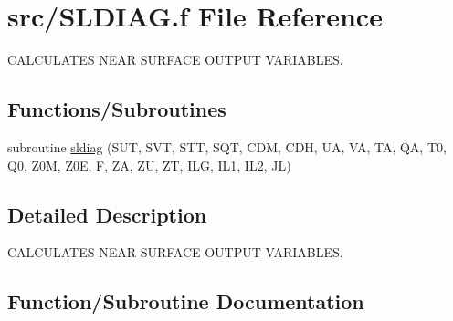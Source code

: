 \hypertarget{SLDIAG_8f}{}\section{src/\+S\+L\+D\+I\+A\+G.f File Reference}
\label{SLDIAG_8f}


C\+A\+L\+C\+U\+L\+A\+T\+E\+S N\+E\+A\+R S\+U\+R\+F\+A\+C\+E O\+U\+T\+P\+U\+T V\+A\+R\+I\+A\+B\+L\+E\+S.  


\subsection*{Functions/\+Subroutines}
\begin{DoxyCompactItemize}
\item 
subroutine \hyperlink{SLDIAG_8f_ad70c758db99cc5fdf4cabbcd33447dd2}{sldiag} (S\+U\+T, S\+V\+T, S\+T\+T, S\+Q\+T, C\+D\+M, C\+D\+H, U\+A, V\+A, T\+A, Q\+A, T0, Q0, Z0\+M, Z0\+E, F, Z\+A, Z\+U, Z\+T, I\+L\+G, I\+L1, I\+L2, J\+L)
\end{DoxyCompactItemize}


\subsection{Detailed Description}
C\+A\+L\+C\+U\+L\+A\+T\+E\+S N\+E\+A\+R S\+U\+R\+F\+A\+C\+E O\+U\+T\+P\+U\+T V\+A\+R\+I\+A\+B\+L\+E\+S. 



\subsection{Function/\+Subroutine Documentation}
\hypertarget{SLDIAG_8f_ad70c758db99cc5fdf4cabbcd33447dd2}{}
